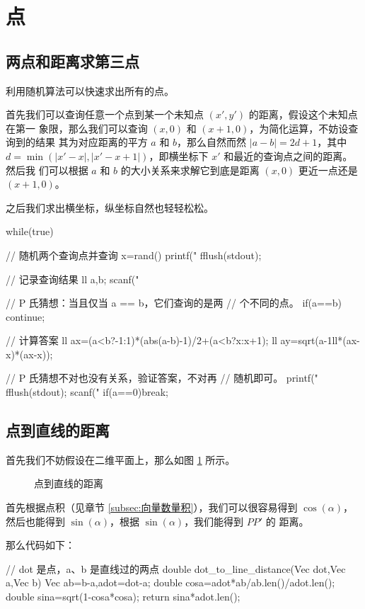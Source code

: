 \section{点}
\subsection{两点和距离求第三点}
利用随机算法可以快速求出所有的点。

首先我们可以查询任意一个点到某一个未知点 $(x', y')$ 的距离，假设这个未知点在第一
象限，那么我们可以查询 $(x, 0)$ 和 $(x + 1, 0)$，为简化运算，不妨设查询到的结果
其为对应距离的平方 $a$ 和 $b$，那么自然而然 $|a - b| = 2d + 1$，其中 $d =
\min(|x' - x|, |x' - x + 1|)$，即横坐标下 $x'$ 和最近的查询点之间的距离。然后我
们可以根据 $a$ 和 $b$ 的大小关系来求解它到底是距离 $(x, 0)$ 更近一点还是 $(x +
1, 0)$。

之后我们求出横坐标，纵坐标自然也轻轻松松。
\begin{Cpp}
while(true){
    // 随机两个查询点并查询
    x=rand()%
    printf("%
    fflush(stdout);

    // 记录查询结果
    ll a,b;
    scanf("%

    // P 氏猜想：当且仅当 a == b，它们查询的是两
    // 个不同的点。
    if(a==b) continue;

    // 计算答案
    ll ax=(a<b?-1:1)*(abs(a-b)-1)/2+(a<b?x:x+1);
    ll ay=sqrt(a-1ll*(ax-x)*(ax-x));

    // P 氏猜想不对也没有关系，验证答案，不对再
    // 随机即可。
    printf("%
    fflush(stdout);
    scanf("%
    if(a==0)break;
}
\end{Cpp}

\subsection{点到直线的距离}
首先我们不妨假设在二维平面上，那么如图 \ref{fig:点到直线的距离} 所示。

\begin{figure}
    \centering
    \caption{点到直线的距离}
    \label{fig:点到直线的距离}
\end{figure}

首先根据点积（见章节 \ref{subsec:向量数量积}），我们可以很容易得到 $\cos(
\alpha)$，然后也能得到 $\sin(\alpha)$，根据 $\sin(\alpha)$，我们能得到 $PP'$ 的
距离。

那么代码如下：
\begin{Cpp}
// dot 是点，a、b 是直线过的两点
double dot_to_line_distance(Vec dot,Vec a,Vec b){
  Vec ab=b-a,adot=dot-a;
  double cosa=adot*ab/ab.len()/adot.len();
  double sina=sqrt(1-cosa*cosa);
  return sina*adot.len();
}
\end{Cpp}

